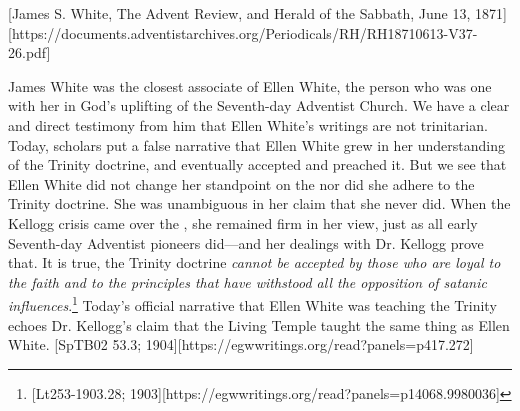 [James S. White, The Advent Review, and Herald of the Sabbath, June 13, 1871][https://documents.adventistarchives.org/Periodicals/RH/RH18710613-V37-26.pdf]


James White was the closest associate of Ellen White, the person who was one with her in God’s uplifting of the Seventh-day Adventist Church. We have a clear and direct testimony from him that Ellen White’s writings are not trinitarian. Today, scholars put a false narrative that Ellen White grew in her understanding of the Trinity doctrine, and eventually accepted and preached it. But we see that Ellen White did not change her standpoint on the  nor did she adhere to the Trinity doctrine. She was unambiguous in her claim that she never did. When the Kellogg crisis came over the , she remained firm in her view, just as all early Seventh-day Adventist pioneers did—and her dealings with Dr. Kellogg prove that. It is true, the Trinity doctrine \textit{cannot be accepted by those who are loyal to the faith and to the principles that have withstood all the opposition of satanic influences}.\footnote{[Lt253-1903.28; 1903][https://egwwritings.org/read?panels=p14068.9980036]} Today’s official narrative that Ellen White was teaching the Trinity echoes Dr. Kellogg’s claim that the Living Temple taught the same thing as Ellen White. [SpTB02 53.3; 1904][https://egwwritings.org/read?panels=p417.272]



